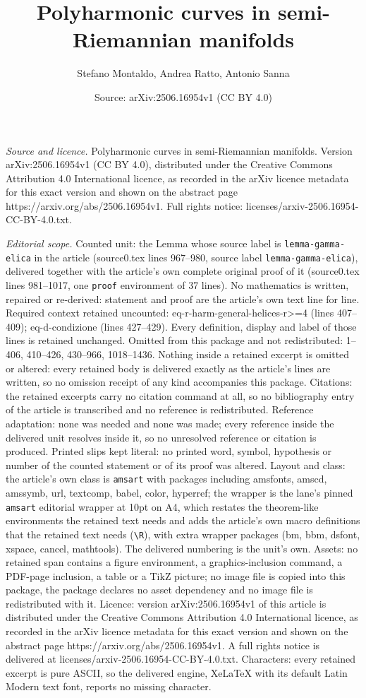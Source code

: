 \documentclass[10pt,a4paper]{amsart}
\title[Polyharmonic curves in semi-Riemannian manifolds]{Polyharmonic curves in semi-Riemannian manifolds}
\author{Stefano Montaldo, Andrea Ratto, Antonio Sanna}
\date{Source: arXiv:2506.16954v1 (CC BY 4.0)}
\begin{document}
\maketitle

\noindent\emph{Source and licence.} Polyharmonic curves in semi-Riemannian manifolds. Version arXiv:2506.16954v1 (CC BY 4.0), distributed under the Creative Commons Attribution 4.0 International licence, as recorded in the arXiv licence metadata for this exact version and shown on the abstract page https://arxiv.org/abs/2506.16954v1. Full rights notice: licenses/arxiv-2506.16954-CC-BY-4.0.txt.\par\smallskip

\noindent\textit{Editorial scope.} Counted unit: the Lemma whose source label is \texttt{lemma-gamma-elica} in the article (source0.tex lines 967--980, source label \texttt{lemma-gamma-elica}), delivered together with the article's own complete original proof of it (source0.tex lines 981--1017, one \texttt{proof} environment of 37 lines). No mathematics is written, repaired or re-derived: statement and proof are the article's own text line for line. Required context retained uncounted: eq-r-harm-general-helices-r>=4 (lines 407--409); eq-d-condizione (lines 427--429). Every definition, display and label of those lines is retained unchanged. Omitted from this package and not redistributed: 1--406, 410--426, 430--966, 1018--1436. Nothing inside a retained excerpt is omitted or altered: every retained body is delivered exactly as the article's lines are written, so no omission receipt of any kind accompanies this package. Citations: the retained excerpts carry no citation command at all, so no bibliography entry of the article is transcribed and no reference is redistributed. Reference adaptation: none was needed and none was made; every reference inside the delivered unit resolves inside it, so no unresolved reference or citation is produced. Printed slips kept literal: no printed word, symbol, hypothesis or number of the counted statement or of its proof was altered. Layout and class: the article's own class is \texttt{amsart} with packages including amsfonts, amscd, amssymb, url, textcomp, babel, color, hyperref; the wrapper is the lane's pinned \texttt{amsart} editorial wrapper at 10pt on A4, which restates the theorem-like environments the retained text needs and adds the article's own macro definitions that the retained text needs (\texttt{\textbackslash R}), with extra wrapper packages (bm, bbm, dsfont, xspace, cancel, mathtools). The delivered numbering is the unit's own. Assets: no retained span contains a figure environment, a graphics-inclusion command, a PDF-page inclusion, a table or a TikZ picture; no image file is copied into this package, the package declares no asset dependency and no image file is redistributed with it. Licence: version arXiv:2506.16954v1 of this article is distributed under the Creative Commons Attribution 4.0 International licence, as recorded in the arXiv licence metadata for this exact version and shown on the abstract page https://arxiv.org/abs/2506.16954v1. A full rights notice is delivered at licenses/arxiv-2506.16954-CC-BY-4.0.txt. Characters: every retained excerpt is pure ASCII, so the delivered engine, XeLaTeX with its default Latin Modern text font, reports no missing character.
\end{document}
